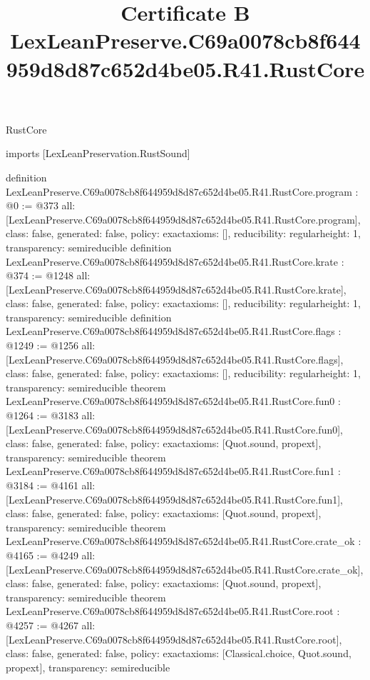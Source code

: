 \begin{lexlean}{RustCore}
\title{Certificate B LexLeanPreserve.C69a0078cb8f644959d8d87c652d4be05.R41.RustCore}
\begin{coremodule}
imports [LexLeanPreservation.RustSound]

definition LexLeanPreserve.C69a0078cb8f644959d8d87c652d4be05.R41.RustCore.program : @0 := @373 {
  all: [LexLeanPreserve.C69a0078cb8f644959d8d87c652d4be05.R41.RustCore.program],
  class: false,
  generated: false,
  policy: exact{axioms: []},
  reducibility: regular{height: 1},
  transparency: semireducible
}
definition LexLeanPreserve.C69a0078cb8f644959d8d87c652d4be05.R41.RustCore.krate : @374 := @1248 {
  all: [LexLeanPreserve.C69a0078cb8f644959d8d87c652d4be05.R41.RustCore.krate],
  class: false,
  generated: false,
  policy: exact{axioms: []},
  reducibility: regular{height: 1},
  transparency: semireducible
}
definition LexLeanPreserve.C69a0078cb8f644959d8d87c652d4be05.R41.RustCore.flags : @1249 := @1256 {
  all: [LexLeanPreserve.C69a0078cb8f644959d8d87c652d4be05.R41.RustCore.flags],
  class: false,
  generated: false,
  policy: exact{axioms: []},
  reducibility: regular{height: 1},
  transparency: semireducible
}
theorem LexLeanPreserve.C69a0078cb8f644959d8d87c652d4be05.R41.RustCore.fun0 : @1264 := @3183 {
  all: [LexLeanPreserve.C69a0078cb8f644959d8d87c652d4be05.R41.RustCore.fun0],
  class: false,
  generated: false,
  policy: exact{axioms: [Quot.sound, propext]},
  transparency: semireducible
}
theorem LexLeanPreserve.C69a0078cb8f644959d8d87c652d4be05.R41.RustCore.fun1 : @3184 := @4161 {
  all: [LexLeanPreserve.C69a0078cb8f644959d8d87c652d4be05.R41.RustCore.fun1],
  class: false,
  generated: false,
  policy: exact{axioms: [Quot.sound, propext]},
  transparency: semireducible
}
theorem LexLeanPreserve.C69a0078cb8f644959d8d87c652d4be05.R41.RustCore.crate_ok : @4165 := @4249 {
  all: [LexLeanPreserve.C69a0078cb8f644959d8d87c652d4be05.R41.RustCore.crate_ok],
  class: false,
  generated: false,
  policy: exact{axioms: [Quot.sound, propext]},
  transparency: semireducible
}
theorem LexLeanPreserve.C69a0078cb8f644959d8d87c652d4be05.R41.RustCore.root : @4257 := @4267 {
  all: [LexLeanPreserve.C69a0078cb8f644959d8d87c652d4be05.R41.RustCore.root],
  class: false,
  generated: false,
  policy: exact{axioms: [Classical.choice, Quot.sound, propext]},
  transparency: semireducible
}


\end{coremodule}
\end{lexlean}
